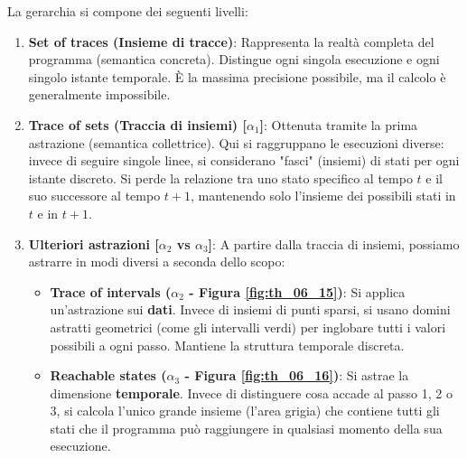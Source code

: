 La gerarchia si compone dei seguenti livelli:

\begin{enumerate}
    \item \textbf{Set of traces (Insieme di tracce)}:
    Rappresenta la realtà completa del programma (semantica concreta).
    Distingue ogni singola esecuzione e ogni singolo istante temporale.
    È la massima precisione possibile, ma il calcolo è generalmente impossibile.

    \item \textbf{Trace of sets (Traccia di insiemi) [$\alpha_1$]}:
    Ottenuta tramite la prima astrazione (semantica collettrice).
    Qui si raggruppano le esecuzioni diverse: invece di seguire singole linee,
    si considerano "fasci" (insiemi) di stati per ogni istante discreto.
    Si perde la relazione tra uno stato specifico al tempo $t$ e il suo
    successore al tempo $t+1$, mantenendo solo l'insieme dei possibili stati
    in $t$ e in $t+1$.

    \item \textbf{Ulteriori astrazioni [$\alpha_2$ vs $\alpha_3$]}:
    A partire dalla traccia di insiemi, possiamo astrarre in modi diversi a
    seconda dello scopo:
    \begin{itemize}
        \item \textbf{Trace of intervals ($\alpha_2$ - Figura \ref{fig:th_06_15})}:
        Si applica un'astrazione sui \textbf{dati}. Invece di insiemi di punti
        sparsi, si usano domini astratti geometrici (come gli intervalli
        verdi) per inglobare tutti i valori possibili a ogni passo. Mantiene
        la struttura temporale discreta.
        \item \textbf{Reachable states ($\alpha_3$ - Figura \ref{fig:th_06_16})}:
        Si astrae la dimensione \textbf{temporale}. Invece di distinguere cosa
        accade al passo 1, 2 o 3, si calcola l'unico grande insieme (l'area
        grigia) che contiene tutti gli stati che il programma può raggiungere
        in qualsiasi momento della sua esecuzione.
    \end{itemize}
\end{enumerate}

